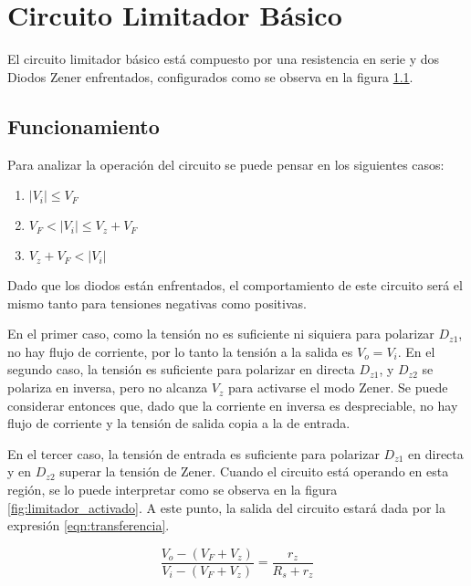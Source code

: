 \chapter{Circuito Limitador Básico}
El circuito limitador básico está compuesto por una resistencia en serie y dos Diodos Zener enfrentados, configurados como se observa en la figura \ref{fig:limitador_basico}.

\begin{figure}[ht]
    \begin{center}
        
        \label{fig:limitador_basico}
    \end{center}
\end{figure}

\section{Funcionamiento} \label{funcionamiento}
Para analizar la operación del circuito se puede pensar en los siguientes casos:

\begin{enumerate}
    \item $|V_i| \leq V_F$
    \item $V_F < |V_i| \leq V_z + V_F$
    \item $V_z + V_F < |V_i|$ 
\end{enumerate}

Dado que los diodos están enfrentados, el comportamiento de este circuito será el mismo tanto para tensiones negativas como positivas.

En el primer caso, como la tensión no es suficiente ni siquiera para polarizar $D_{z1}$, no hay flujo de corriente, por lo tanto la tensión a la salida es $V_o = V_i$. En el segundo caso, la tensión es suficiente para polarizar en directa $D_{z1}$, y $D_{z2}$ se polariza en inversa, pero no alcanza $V_z$ para activarse el modo Zener. Se puede considerar entonces que, dado que la corriente en inversa es despreciable, no hay flujo de corriente y la tensión de salida copia a la de entrada.

En el tercer caso, la tensión de entrada es suficiente para polarizar $D_{z1}$ en directa y en $D_{z2}$ superar la tensión de Zener. Cuando el circuito está operando en esta región, se lo puede interpretar como se observa en la figura \ref{fig:limitador_activado}. A este punto, la salida del circuito estará dada por la expresión \eqref{eqn:transferencia}.

\begin{equation}
    \frac{V_o - (V_F + V_z)}{V_i - (V_F + V_z)}=\frac{r_z}{R_s + r_z}
    \label{eqn:transferencia}
\end{equation}

